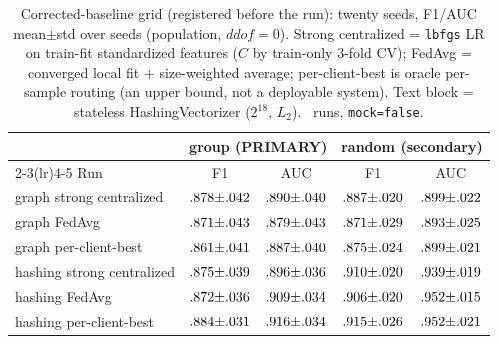 \documentclass[sigconf,nonacm]{acmart}
\begin{document}
\begin{table}[t]
\centering\small
\caption{Corrected-baseline grid (registered before the run): twenty
seeds, F1/AUC mean$\pm$std over seeds (population, $ddof{=}0$). Strong
centralized = \texttt{lbfgs} LR on train-fit standardized features ($C$
by train-only 3-fold CV); FedAvg = converged local fit + size-weighted
average; per-client-best is oracle per-sample routing (an upper bound,
not a deployable system). Text block = stateless HashingVectorizer
($2^{18}$, $L_2$).
\pmPzRuns\ runs, \texttt{mock=false}.
}\label{tab:main}
\begin{tabular}{lcccc}
\toprule
 & \multicolumn{2}{c}{group (PRIMARY)} & \multicolumn{2}{c}{random (secondary)} \\
\cmidrule(lr){2-3}\cmidrule(lr){4-5}
Run & F1 & AUC & F1 & AUC \\
\midrule
graph strong centralized & $.878{\pm}.042$ & $.890{\pm}.040$ & $.887{\pm}.020$ & $.899{\pm}.022$ \\
graph FedAvg & $.871{\pm}.043$ & $.879{\pm}.043$ & $.871{\pm}.029$ & $.893{\pm}.025$ \\
graph per-client-best & $.861{\pm}.041$ & $.887{\pm}.040$ & $.875{\pm}.024$ & $.899{\pm}.021$ \\
\midrule
hashing strong centralized & $.875{\pm}.039$ & $.896{\pm}.036$ & $.910{\pm}.020$ & $.939{\pm}.019$ \\
hashing FedAvg & $.872{\pm}.036$ & $.909{\pm}.034$ & $.906{\pm}.020$ & $.952{\pm}.015$ \\
hashing per-client-best & $.884{\pm}.031$ & $.916{\pm}.034$ & $.915{\pm}.026$ & $.952{\pm}.021$ \\
\bottomrule
\end{tabular}
\end{table}
\end{document}
